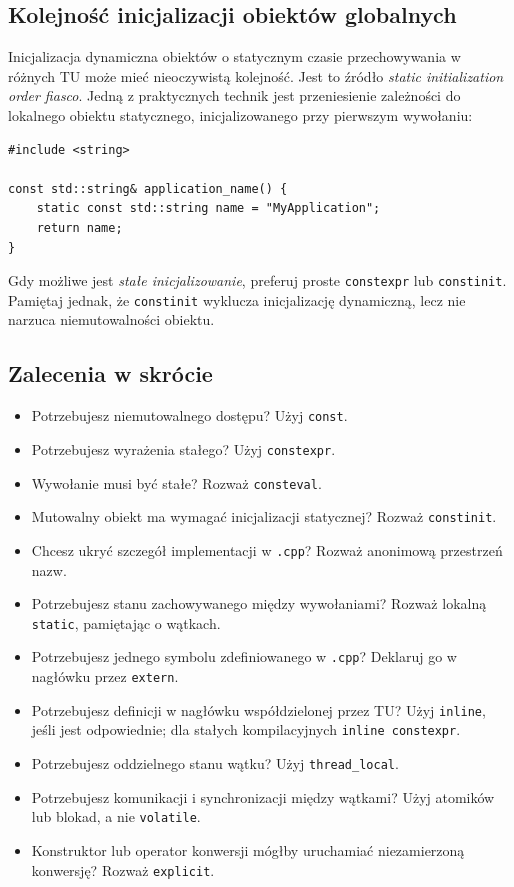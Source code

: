 \subsection{Kolejność inicjalizacji obiektów globalnych}

Inicjalizacja dynamiczna obiektów o statycznym czasie przechowywania
w różnych TU może mieć nieoczywistą kolejność. Jest to źródło
\emph{static initialization order fiasco}. Jedną z praktycznych
technik jest przeniesienie zależności do lokalnego obiektu
statycznego, inicjalizowanego przy pierwszym wywołaniu:

\begin{lstlisting}
#include <string>

const std::string& application_name() {
    static const std::string name = "MyApplication";
    return name;
}
\end{lstlisting}

Gdy możliwe jest \emph{stałe inicjalizowanie}, preferuj proste
\texttt{constexpr} lub \texttt{constinit}. Pamiętaj jednak, że
\texttt{constinit} wyklucza inicjalizację dynamiczną, lecz
nie narzuca niemutowalności obiektu.

\subsection{Zalecenia w skrócie}

\begin{itemize}
    \item Potrzebujesz niemutowalnego dostępu? Użyj \texttt{const}.
    \item Potrzebujesz wyrażenia stałego? Użyj \texttt{constexpr}.
    \item Wywołanie musi być stałe? Rozważ \texttt{consteval}.
    \item Mutowalny obiekt ma wymagać inicjalizacji statycznej?
    Rozważ \texttt{constinit}.
    \item Chcesz ukryć szczegół implementacji w \texttt{.cpp}?
    Rozważ anonimową przestrzeń nazw.
    \item Potrzebujesz stanu zachowywanego między wywołaniami?
    Rozważ lokalną \texttt{static}, pamiętając o wątkach.
    \item Potrzebujesz jednego symbolu zdefiniowanego w \texttt{.cpp}?
    Deklaruj go w nagłówku przez \texttt{extern}.
    \item Potrzebujesz definicji w nagłówku współdzielonej przez TU?
    Użyj \texttt{inline}, jeśli jest odpowiednie; dla stałych
    kompilacyjnych \texttt{inline constexpr}.
    \item Potrzebujesz oddzielnego stanu wątku? Użyj \texttt{thread\_local}.
    \item Potrzebujesz komunikacji i synchronizacji między wątkami?
    Użyj atomików lub blokad, a nie \texttt{volatile}.
    \item Konstruktor lub operator konwersji mógłby uruchamiać
    niezamierzoną konwersję? Rozważ \texttt{explicit}.
\end{itemize}

